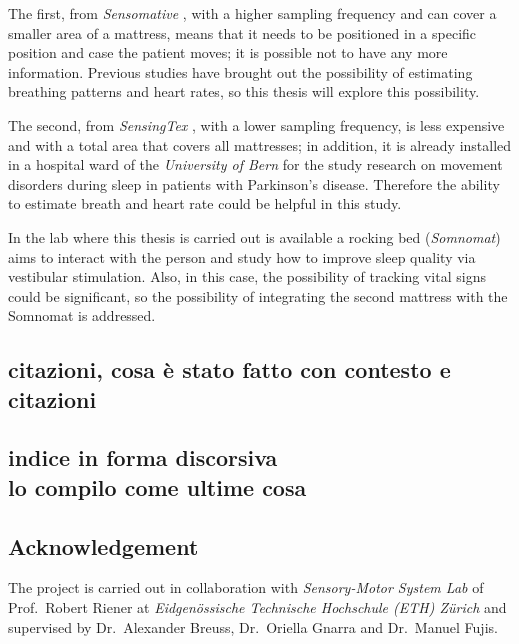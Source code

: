 The first, from \textit{Sensomative} \cite{sensomative}, with a higher sampling frequency and can cover a smaller area of a mattress, means that it needs to be positioned in a specific position and case the patient moves; it is possible not to have any more information. Previous studies have brought out the possibility of estimating breathing patterns and heart rates, so this thesis will explore this possibility.

The second, from \textit{SensingTex} \cite{sentex}, with a lower sampling frequency, is less expensive and with a total area that covers all mattresses; in addition, it is already installed in a hospital ward of the \textit{University of Bern} for the study research on movement disorders during sleep in patients with Parkinson’s disease. Therefore the ability to estimate breath and heart rate could be helpful in this study.

In the lab where this thesis is carried out is available a rocking bed (\textit{Somnomat}) aims to interact with the person and study how to improve sleep quality via vestibular stimulation. Also, in this case, the possibility of tracking vital signs could be significant, so the possibility of integrating the second mattress with the Somnomat is addressed.



\subsection*{citazioni, cosa è stato fatto con contesto e citazioni}





\subsection*{indice in forma discorsiva \\ lo compilo come ultime cosa}

\subsection*{Acknowledgement}
The project is carried out in collaboration with \textit{Sensory-Motor System Lab} of Prof.~Robert Riener at \textit{Eidgenössische Technische Hochschule 
(ETH) Zürich} and supervised by Dr.~Alexander Breuss, Dr.~Oriella Gnarra and Dr.~Manuel Fujis.




